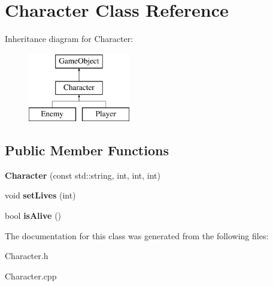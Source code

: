 \hypertarget{class_character}{}\section{Character Class Reference}
\label{class_character}
Inheritance diagram for Character\+:\begin{figure}[H]
\begin{center}
\leavevmode
\includegraphics[height=3.000000cm]{class_character}
\end{center}
\end{figure}
\subsection*{Public Member Functions}
\begin{DoxyCompactItemize}
\item 
\mbox{\label{class_character_a83f1f8a2eb47e7a891ef14e673703e15}} 
{\bfseries Character} (const std\+::string, int, int, int)
\item 
\mbox{\label{class_character_a5c979ca4dd41c717ff7f6a620c67c0ff}} 
void {\bfseries set\+Lives} (int)
\item 
\mbox{\label{class_character_aa49f985b1b05751b2d4b3de74b4acc8c}} 
bool {\bfseries is\+Alive} ()
\end{DoxyCompactItemize}


The documentation for this class was generated from the following files\+:\begin{DoxyCompactItemize}
\item 
Character.\+h\item 
Character.\+cpp\end{DoxyCompactItemize}
